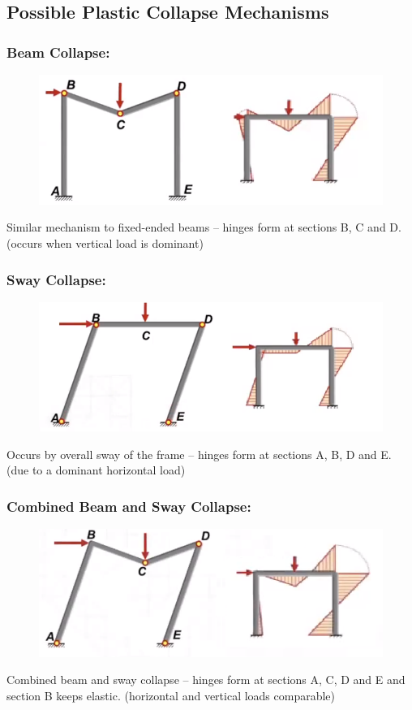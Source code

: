 \documentclass[class=report, crop=false, 12pt,a4paper]{standalone}
\begin{document}
\subsection{Possible Plastic Collapse Mechanisms}
\subsubsection{Beam Collapse:}
\begin{figure}[H]
  \centering
  \includegraphics[width = 0.65 \textwidth]{../img/beam49.PNG}
\end{figure}
Similar mechanism to fixed-ended beams – hinges form at sections B, C and D. (occurs when vertical load is dominant)
\subsubsection{Sway Collapse:}
\begin{figure}[H]
  \centering
  \includegraphics[width = 0.7 \textwidth]{../img/beam50.PNG}
\end{figure}
Occurs by overall sway of the frame – hinges form at sections A, B, D and E. (due to a dominant horizontal load)
\subsubsection{Combined Beam and Sway Collapse:}
\begin{figure}[H]
  \centering
  \includegraphics[width = 0.7 \textwidth]{../img/beam51.PNG}
\end{figure}
Combined beam and sway collapse – hinges form at sections A, C, D and E and section B keeps elastic. (horizontal and vertical loads comparable)
\end{document}
